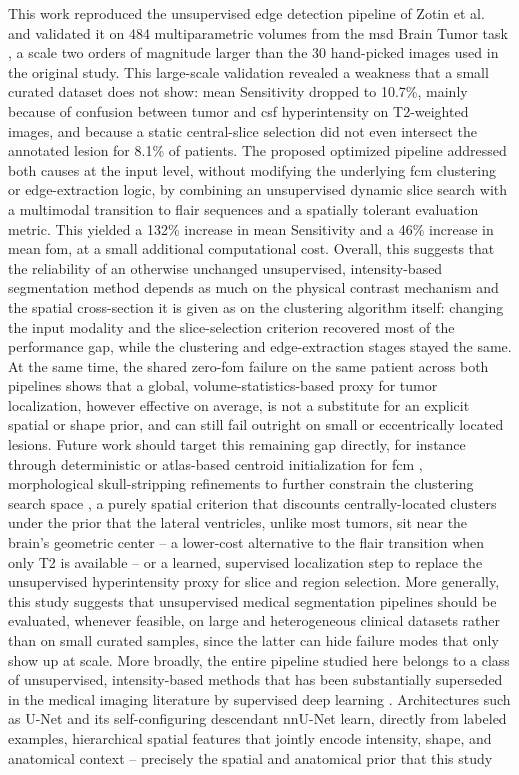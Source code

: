 This work reproduced the unsupervised edge detection pipeline of Zotin et al. \cite{zotin2018edge} and validated it on 484 multiparametric volumes from the \gls{msd} Brain Tumor task \cite{antonelli2022medical}, a scale two orders of magnitude larger than the 30 hand-picked images used in the original study. This large-scale validation revealed a weakness that a small curated dataset does not show: mean Sensitivity dropped to 10.7\%, mainly because of confusion between tumor and \gls{csf} hyperintensity on T2-weighted images, and because a static central-slice selection did not even intersect the annotated lesion for 8.1\% of patients. The proposed optimized pipeline addressed both causes at the input level, without modifying the underlying \gls{fcm} clustering or edge-extraction logic, by combining an unsupervised dynamic slice search with a multimodal transition to \gls{flair} sequences and a spatially tolerant evaluation metric. This yielded a 132\% increase in mean Sensitivity and a 46\% increase in mean \gls{fom}, at a small additional computational cost. Overall, this suggests that the reliability of an otherwise unchanged unsupervised, intensity-based segmentation method depends as much on the physical contrast mechanism and the spatial cross-section it is given as on the clustering algorithm itself: changing the input modality and the slice-selection criterion recovered most of the performance gap, while the clustering and edge-extraction stages stayed the same. At the same time, the shared zero-\gls{fom} failure on the same patient across both pipelines shows that a global, volume-statistics-based proxy for tumor localization, however effective on average, is not a substitute for an explicit spatial or shape prior, and can still fail outright on small or eccentrically located lesions. Future work should target this remaining gap directly, for instance through deterministic or atlas-based centroid initialization for \gls{fcm} \cite{benson2016brain, szilagyi2003mri}, morphological skull-stripping refinements to further constrain the clustering search space \cite{hooda2014brain}, a purely spatial criterion that discounts centrally-located clusters under the prior that the lateral ventricles, unlike most tumors, sit near the brain's geometric center -- a lower-cost alternative to the \gls{flair} transition when only T2 is available -- or a learned, supervised localization step to replace the unsupervised hyperintensity proxy for slice and region selection. More generally, this study suggests that unsupervised medical segmentation pipelines should be evaluated, whenever feasible, on large and heterogeneous clinical datasets rather than on small curated samples, since the latter can hide failure modes that only show up at scale. More broadly, the entire pipeline studied here belongs to a class of unsupervised, intensity-based methods that has been substantially superseded in the medical imaging literature by supervised deep learning \cite{magadza2021survey}. Architectures such as U-Net \cite{ronneberger2015unet} and its self-configuring descendant nnU-Net \cite{isensee2021nnunet} learn, directly from labeled examples, hierarchical spatial features that jointly encode intensity, shape, and anatomical context -- precisely the spatial and anatomical prior that this study 